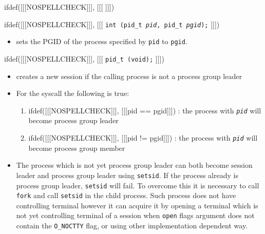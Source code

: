 ifdef([[[NOSPELLCHECK]]], [[[
]]])

\begin{slide}
ifdef([[[NOSPELLCHECK]]], [[[
\texttt{int (pid\_t \emph{pid}, pid\_t \emph{pgid});}
]]])
\begin{itemize}
\item sets the PGID of the process specified by \texttt{pid} to \texttt{pgid}.
\end{itemize}
ifdef([[[NOSPELLCHECK]]], [[[
\texttt{pid\_t (void);}
]]])
\begin{itemize}
\item creates a new session if the calling process is not a process
group leader
\end{itemize}
\end{slide}

\begin{itemize}
\item For the  syscall the following is true:
\begin{enumerate}
\item ifdef([[[NOSPELLCHECK]]], [[[pid == pgid]]]) : the process with
\emph{\texttt{pid}} will become process group leader
\item ifdef([[[NOSPELLCHECK]]], [[[pid != pgid]]]) : the process with
\emph{\texttt{pid}} will become process group member
\end{enumerate}
\item The process which is not yet process group leader can both become session
leader and process group leader using \texttt{setsid}. If the process already is
process group leader, \texttt{setsid} will fail. To overcome this it is necessary
to call \texttt{fork} and call \texttt{setsid} in the child process.
Such process does not have controlling terminal however it can acquire it by
opening a terminal which is not yet controlling terminal of a session when
\texttt{open} flags argument does not contain the \texttt{O\_NOCTTY} flag,
or using other implementation dependent way.
\end{itemize}




